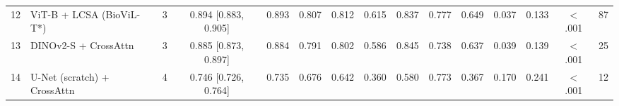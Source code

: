 \begin{table}[!t]
\begin{tabular}{llccccccccccccc}
12 & ViT-B + LCSA (BioViL-T*) & 3 & 0.894 [0.883, 0.905] & 0.893 & 0.807 & 0.812 & 0.615 & 0.837 & 0.777 & 0.649 & 0.037 & 0.133 & $<$.001 & 87 \\
13 & DINOv2-S + CrossAttn & 3 & 0.885 [0.873, 0.897] & 0.884 & 0.791 & 0.802 & 0.586 & 0.845 & 0.738 & 0.637 & 0.039 & 0.139 & $<$.001 & 25 \\
14 & U-Net (scratch) + CrossAttn & 4 & 0.746 [0.726, 0.764] & 0.735 & 0.676 & 0.642 & 0.360 & 0.580 & 0.773 & 0.367 & 0.170 & 0.241 & $<$.001 & 12 \\
\bottomrule
\end{tabular}
\end{table}